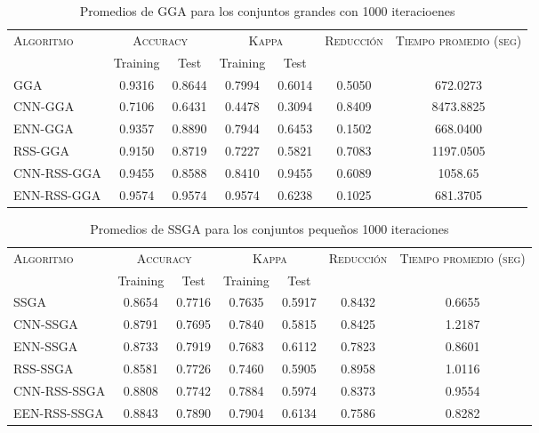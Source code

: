 \begin{table}[]
\centering
\begin{tabular}{l c c c c c c}
\hline
\multirow{2}{*}{\textsc{Algoritmo}}
	& \multicolumn{2}{c}{\textsc{Accuracy}}
	& \multicolumn{2}{c}{\textsc{Kappa}}
	& \textsc{Reducción}
	& \textsc{Tiempo promedio (seg)} \\
	& Training & Test
	& Training & Test \\ 
\hline
\hline

GGA         & 0.9316 & 0.8644 & 0.7994 & 0.6014 & 0.5050 & 672.0273 \\
CNN-GGA     & 0.7106 & 0.6431 & 0.4478 & 0.3094 & 0.8409 & 8473.8825 \\
ENN-GGA     & 0.9357 & 0.8890 & 0.7944 & 0.6453 & 0.1502 & 668.0400 \\
RSS-GGA     & 0.9150 & 0.8719 & 0.7227 & 0.5821 & 0.7083 & 1197.0505 \\
CNN-RSS-GGA & 0.9455 & 0.8588 & 0.8410 & 0.9455 & 0.6089 & 1058.65 \\
ENN-RSS-GGA & 0.9574 & 0.9574 & 0.9574 & 0.6238 & 0.1025 & 681.3705 \\

\hline
\end{tabular}
\caption{Promedios de GGA para los conjuntos grandes con 1000 iteracioenes}
\label{grande-gga}
\end{table}

\begin{table}[]
\centering
\begin{tabular}{l c c c c c c}
\hline
\multirow{2}{*}{\textsc{Algoritmo}}
	& \multicolumn{2}{c}{\textsc{Accuracy}}
	& \multicolumn{2}{c}{\textsc{Kappa}}
	& \textsc{Reducción}
	& \textsc{Tiempo promedio (seg)} \\
	& Training & Test
	& Training & Test \\ 
\hline
\hline

SSGA & 0.8654 & 0.7716 & 0.7635 & 0.5917 & 0.8432 & 0.6655 \\
CNN-SSGA & 0.8791 & 0.7695 & 0.7840 & 0.5815 & 0.8425 & 1.2187 \\
ENN-SSGA & 0.8733 & 0.7919 & 0.7683 & 0.6112 & 0.7823 & 0.8601 \\
RSS-SSGA & 0.8581 & 0.7726 & 0.7460 & 0.5905 & 0.8958 & 1.0116 \\
CNN-RSS-SSGA & 0.8808 & 0.7742 & 0.7884 & 0.5974 & 0.8373 & 0.9554 \\
EEN-RSS-SSGA & 0.8843 & 0.7890 & 0.7904 & 0.6134 & 0.7586 & 0.8282 \\

\hline
\end{tabular}
\caption{Promedios de SSGA para los conjuntos pequeños 1000 iteraciones}
\label{peq-ssga}
\end{table}


